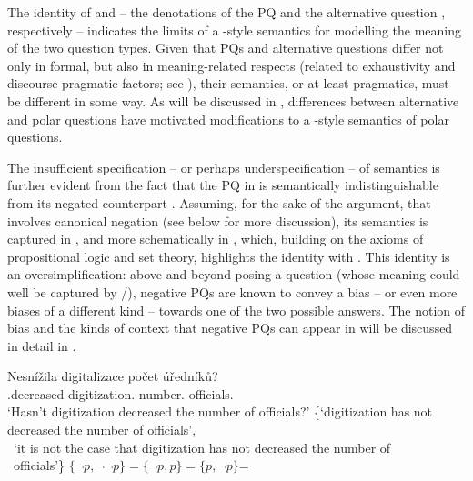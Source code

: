 \documentclass[output=paper,colorlinks,citecolor=brown]{langscibook}
\begin{document}
\noindent The identity of  and  -- the denotations of the PQ  and the alternative question , respectively -- indicates the limits of a \citeauthor{Hamblin1973}-style semantics for modelling the meaning of the two question types. Given that PQs and alternative questions differ not only in formal, but also in meaning-related respects (related to exhaustivity and discourse-pragmatic factors; see \citealt{Bolinger1978,Biezma2009,Biezma.Rawlins2012}), their semantics, or at least pragmatics, must be different in some way. As will be discussed in , differences between alternative and polar questions have motivated modifications to a \citeauthor{Hamblin1973}-style semantics of polar questions.

The insufficient specification -- or perhaps underspecification -- of  semantics is further evident from the fact that the PQ in  is semantically indistinguishable from its negated counterpart . Assuming, for the sake of the argument, that  involves canonical negation (see below for more discussion), its semantics is captured in , and more schematically in , which, building on the axioms of propositional logic and set theory, highlights the identity with . This identity is an oversimplification: above and beyond posing a question (whose meaning could well be captured by /), negative PQs are known to convey a bias -- or even more biases of a different kind -- towards one of the two possible answers. The notion of bias and the kinds of context that negative PQs can appear in will be discussed in detail in .

\ea\label{sim:ex:npq1-cz-all}\ea \gll Nesnížila digitalizace počet úředníků?\label{sim:ex:npq1-cz}\\
\NEG.decreased digitization.{\NOM} number.{\ACC} officials.{\GEN}\\
\glt `Hasn't digitization decreased the number of officials?'
\ex \{`digitization has not decreased the number of officials',\\
~`it is not the case that digitization has not decreased the number of\\ ~officials'\}\label{sim:ex:npq-denot1}
\ex $\{\neg p,\neg\neg p\}=\{\neg p,p\}=\{p,\neg p\}$\hfill = \label{sim:ex:npq-denot2}
\z\z
\end{document}
